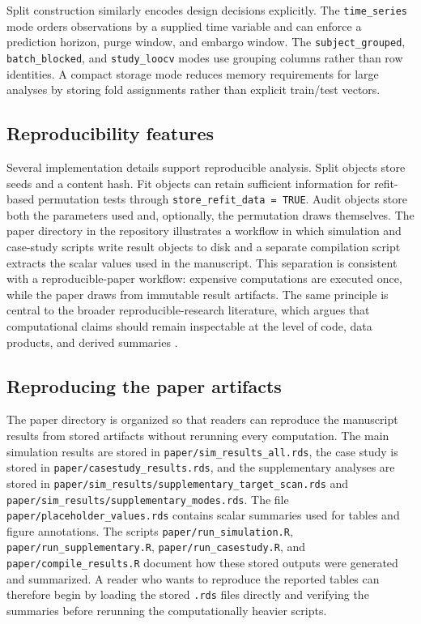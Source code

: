 \documentclass[article]{jss}
\begin{document}
Split construction similarly encodes design decisions explicitly. The
\texttt{time\_series} mode orders observations by a supplied time variable and
can enforce a prediction horizon, purge window, and embargo window. The
\texttt{subject\_grouped}, \texttt{batch\_blocked}, and \texttt{study\_loocv}
modes use grouping columns rather than row identities. A compact storage mode
reduces memory requirements for large analyses by storing fold assignments
rather than explicit train/test vectors.

\subsection{Reproducibility features}

Several implementation details support reproducible analysis. Split objects
store seeds and a content hash. Fit objects can retain sufficient information
for refit-based permutation tests through \texttt{store\_refit\_data = TRUE}.
Audit objects store both the parameters used and, optionally, the permutation
draws themselves. The paper directory in the repository illustrates a workflow
in which simulation and case-study scripts write result objects to disk and a
separate compilation script extracts the scalar values used in the manuscript.
This separation is consistent with a reproducible-paper workflow: expensive
computations are executed once, while the paper draws from immutable result
artifacts. The same principle is central to the broader reproducible-research
literature, which argues that computational claims should remain inspectable at
the level of code, data products, and derived summaries \citep{gentleman2007, peng2011, sandve2013}.

\subsection{Reproducing the paper artifacts}

The paper directory is organized so that readers can reproduce the manuscript
results from stored artifacts without rerunning every computation. The main
simulation results are stored in \texttt{paper/sim\_results\_all.rds}, the case
study is stored in \texttt{paper/casestudy\_results.rds}, and the supplementary
analyses are stored in \texttt{paper/sim\_results/supplementary\_target\_scan.rds}
and \texttt{paper/sim\_results/supplementary\_modes.rds}. The file
\texttt{paper/placeholder\_values.rds} contains scalar summaries used for
tables and figure annotations. The scripts \texttt{paper/run\_simulation.R},
\texttt{paper/run\_supplementary.R}, \texttt{paper/run\_casestudy.R}, and
\texttt{paper/compile\_results.R} document how these stored outputs were
generated and summarized. A reader who wants to reproduce the reported tables
can therefore begin by loading the stored \texttt{.rds} files directly and
verifying the summaries before rerunning the computationally heavier scripts.
\end{document}
